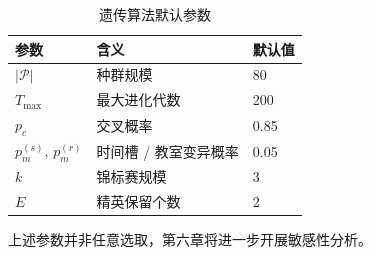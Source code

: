 \begin{table}[H]
  \centering
  \caption{遗传算法默认参数}
  \label{tab:ga-params}
  \begin{tabularx}{\linewidth}{l X l}
    \toprule
    \textbf{参数} & \textbf{含义} & \textbf{默认值} \\
    \midrule
    $|\mathcal{P}|$ & 种群规模 & 80 \\
    $T_{\max}$ & 最大进化代数 & 200 \\
    $p_c$ & 交叉概率 & 0.85 \\
    $p_m^{(s)}$, $p_m^{(r)}$ & 时间槽 / 教室变异概率 & 0.05 \\
    $k$ & 锦标赛规模 & 3 \\
    $E$ & 精英保留个数 & 2 \\
    \bottomrule
  \end{tabularx}
\end{table}

上述参数并非任意选取，第六章将进一步开展敏感性分析。
